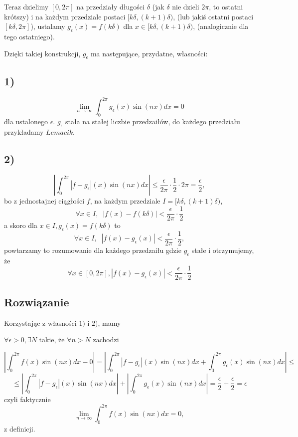 \documentclass{article}
\begin{document}
Teraz dzielimy $[0, 2\pi]$ na przedziały długości $\delta$ (jak $\delta$ nie dzieli $2\pi$, to ostatni krótszy) i na każdym przedziale postaci $[k\delta, (k+1)\delta)$, (lub jakiś ostatni postaci $[k\delta, 2\pi]$), ustalamy $g_{\epsilon}(x) = f(k\delta)$ dla $x\in [k\delta, (k+1)\delta)$, (analogicznie dla tego ostatniego).

Dzięki takiej konstrukcji, $g_{\epsilon}$ ma następujące, przydatne, własności:

\subsection*{1)}

$$ \lim_{n\to\infty}\int_0^{2\pi}g_{\epsilon}(x)\sin(nx)dx = 0$$
dla ustalonego $\epsilon$. $g_{\epsilon}$ stała na stałej liczbie przedzaiłów, do każdego przedziału przykładamy $Lemacik$.
\subsection*{2)}
$$ \left| \int_0^{2\pi}|f-g_{\epsilon}|(x)\sin(nx)dx \right| \le \frac{\epsilon}{2\pi}\cdot\frac{1}{2} \cdot2\pi = \frac{\epsilon}{2},$$
bo z jednostajnej ciągłości $f$, na każdym przedziale $I=[k\delta, (k+1)\delta)$, 
$$\forall x \in I,\;\; |f(x)-f(k\delta)| < \frac{\epsilon}{2\pi}\cdot\frac{1}{2}$$ 
a skoro dla $x\in I, g_{\epsilon}(x) = f(k\delta)$ to
$$\forall x \in I, \;\; |f(x) - g_{\epsilon}(x)| < \frac{\epsilon}{2\pi}\cdot\frac{1}{2},$$
powtarzamy to rozumowanie dla każdego przedzaiłu gdzie $g_{\epsilon}$ stałe i otrzymujemy, że
$$ \forall x \in [0, 2\pi], |f(x)-g_{\epsilon}(x)| < \frac{\epsilon}{2\pi}\cdot\frac{1}{2}$$

\subsection*{Rozwiązanie}
Korzystając z własności $1)$ i $2)$, mamy \newline

$\forall \epsilon > 0, \exists N$ takie, że  $\forall n > N$ zachodzi

$$ \left| \int_0^{2\pi}f(x)\sin(nx)dx - 0 \right| =
\left| \int_0^{2\pi} |f-g_{\epsilon}|(x)\sin(nx)dx + \int_0^{2\pi}g_{\epsilon}(x)\sin(nx)dx \right|
\le $$ 
$$ \le \left| \int_0^{2\pi} |f-g_{\epsilon}|(x)\sin(nx)dx \right| + \left| \int_0^{2\pi}g_{\epsilon}(x)\sin(nx)dx \right| = \frac{\epsilon}{2} + \frac{\epsilon}{2} = \epsilon $$
czyli faktycznie
$$\lim_{n\to\infty}\int_0^{2\pi}f(x)\sin(nx)dx = 0,$$
z definicji.
\end{document}
